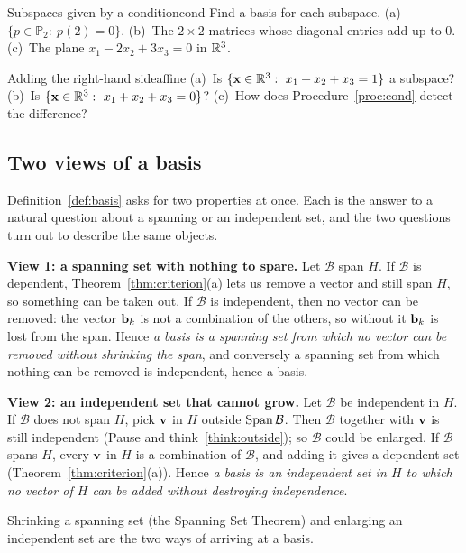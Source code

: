 \documentclass[11pt]{article}
\begin{document}
\begin{kc}{Subspaces given by a condition}{cond}
Find a basis for each subspace. (a)~$\{p\in\mathbb{P}_2:\ p(2)=0\}$. (b)~The $2\times2$ matrices whose diagonal entries add up to $0$. (c)~The plane $x_1-2x_2+3x_3=0$ in $\mathbb{R}^3$.
\end{kc}

\begin{think}{Adding the right-hand side}{affine}
(a)~Is $\{\mathbf{x}\in\mathbb{R}^3:\ x_1+x_2+x_3=1\}$ a subspace? (b)~Is $\{\bv{x}\in\R^3:\ x_1+x_2+x_3=0\}$? (c)~How does Procedure~\ref{proc:cond} detect the difference?
\end{think}

\subsection*{Two views of a basis}

Definition~\ref{def:basis} asks for two properties at once. Each is the answer to a natural question about a spanning or an independent set, and the two questions turn out to describe the same objects.

\textbf{View 1: a spanning set with nothing to spare.} Let $\mathcal{B}$ span $H$. If $\mathcal{B}$ is dependent, Theorem~\ref{thm:criterion}(a) lets us remove a vector and still span $H$, so something can be taken out. If $\mathcal{B}$ is independent, then no vector can be removed: the vector $\mathbf{b}_k$ is not a combination of the others, so without it $\mathbf{b}_k$ is lost from the span. Hence \emph{a basis is a spanning set from which no vector can be removed without shrinking the span}, and conversely a spanning set from which nothing can be removed is independent, hence a basis.

\textbf{View 2: an independent set that cannot grow.} Let $\mathcal{B}$ be independent in $H$. If $\mathcal{B}$ does not span $H$, pick $\mathbf{v}$ in $H$ outside $\operatorname{Span}\mathcal{B}$. Then $\mathcal{B}$ together with $\mathbf{v}$ is still independent (Pause and think~\ref{think:outside}); so $\mathcal{B}$ could be enlarged. If $\mathcal{B}$ spans $H$, every $\mathbf{v}$ in $H$ is a combination of $\mathcal{B}$, and adding it gives a dependent set (Theorem~\ref{thm:criterion}(a)). Hence \emph{a basis is an independent set in $H$ to which no vector of $H$ can be added without destroying independence}.

Shrinking a spanning set (the Spanning Set Theorem) and enlarging an independent set are the two ways of arriving at a basis.
\end{document}
